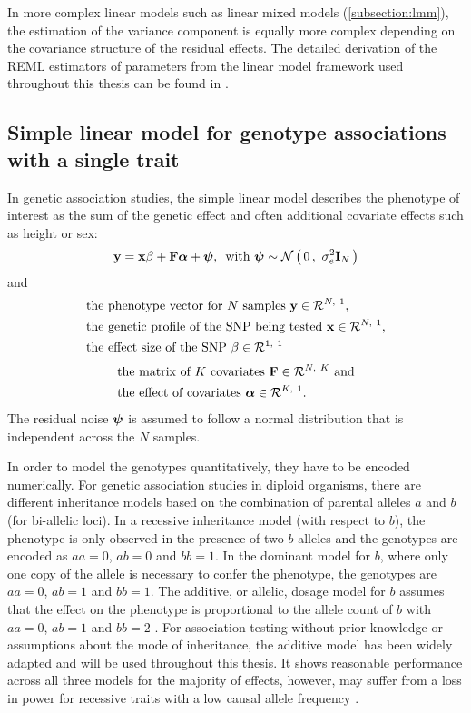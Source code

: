 In more complex linear models such as linear mixed models (\cref{subsection:lmm}), the estimation of the variance component is equally more complex depending on the covariance structure of the residual effects. The detailed derivation of the REML estimators of parameters from the linear model framework used  throughout this thesis can be found in \citep[Supplementary material]{Casale2015}. 

\subsection{Simple linear model for genotype associations with a single trait}
\label{subsection:lm-uv}
In genetic association studies, the simple linear model describes the phenotype of interest as the sum of the genetic effect and often additional covariate effects such as height or sex:
\begin{equation}
\boldsymbol{\mathbf{y}} = \boldsymbol{\mathbf{x}}\beta + \boldsymbol{\mathbf{F}}\boldsymbol{\mathbf{\alpha}} + \boldsymbol{\mathbf{\psi}}, \,\text{ with }
\boldsymbol{\mathbf{\psi}} \sim \mathcal{N}\left(\,{0}\,,~{\sigma_e^2\boldsymbol{\mathbf{I}}_{N}}\,\right)
\label{eq:lm-uv}
\end{equation}
%
and
%
\begin{align*} 
& \text{the phenotype vector for $N$ samples } \boldsymbol{\mathbf{y}} \in \mathcal{R}^{N,~1},\\
& \text{the genetic profile of the SNP being tested }\boldsymbol{\mathbf{x}} \in \mathcal{R}^{N,~1},\\
& \text{the effect size of the SNP } \beta \in \mathcal{R}^{1,~1}
\end{align*} %
\begin{align*} 
& \text{the matrix of $K$ covariates }\boldsymbol{\mathbf{F}} \in \mathcal{R}^{N,~K} \text{ and}\\
& \text{the effect of covariates } \boldsymbol{\mathbf{\alpha}} \in \mathcal{R}^{K,~1}.
\end{align*} 
%
The residual noise \(\boldsymbol{\mathbf{\psi}}\) is assumed to follow a normal distribution that is independent across the \(N\) samples.

In order to model the genotypes quantitatively, they have to be encoded numerically. For genetic association studies in diploid organisms, there are different inheritance models based on the combination of parental alleles \(a\) and \(b\) (for bi-allelic loci). In a recessive inheritance model (with respect to \(b\)), the phenotype is only observed in the presence of two \(b\) alleles and the genotypes are encoded as \(aa=0\), \(ab=0\) and \(bb=1\). In the dominant model for \(b\), where only one copy of the allele is necessary to confer the phenotype, the genotypes are \(aa=0\), \(ab=1\) and \(bb=1\). The additive, or allelic, dosage model for \(b\) assumes that the effect on the phenotype is proportional to the allele count of \(b\) with \(aa=0\), \(ab=1\) and \(bb=2\) \citep{Bush2012}. For association testing without prior knowledge or assumptions about the mode of inheritance, the additive model has been widely adapted and will be used throughout this thesis. It shows reasonable performance across all three models for the majority of effects, however, may suffer from a loss in power for recessive traits with a low causal allele frequency \citep{Lettre2007}. 

